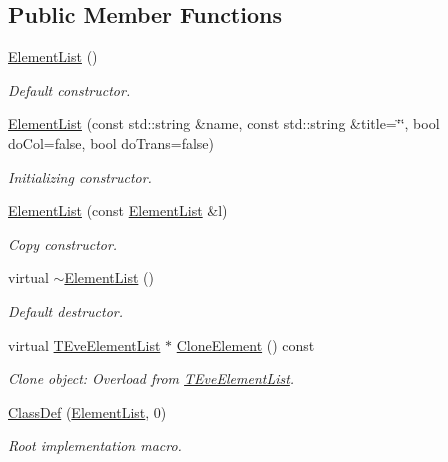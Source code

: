 \subsection*{Public Member Functions}
\begin{DoxyCompactItemize}
\item 
\hyperlink{class_d_d4hep_1_1_element_list_add023eff52a3dc205c33891c200cace1}{ElementList} ()
\begin{DoxyCompactList}\small\item\em Default constructor. \item\end{DoxyCompactList}\item 
\hyperlink{class_d_d4hep_1_1_element_list_a9ac013ec9cc0b96d6c31e19401765833}{ElementList} (const std::string \&name, const std::string \&title=\char`\"{}\char`\"{}, bool doCol=false, bool doTrans=false)
\begin{DoxyCompactList}\small\item\em Initializing constructor. \item\end{DoxyCompactList}\item 
\hyperlink{class_d_d4hep_1_1_element_list_a573686af3429e4ddceac2062f16d704f}{ElementList} (const \hyperlink{class_d_d4hep_1_1_element_list}{ElementList} \&l)
\begin{DoxyCompactList}\small\item\em Copy constructor. \item\end{DoxyCompactList}\item 
virtual \hyperlink{class_d_d4hep_1_1_element_list_a400de029850c5e46b89d0178b0a5f7dc}{$\sim$ElementList} ()
\begin{DoxyCompactList}\small\item\em Default destructor. \item\end{DoxyCompactList}\item 
virtual \hyperlink{class_t_eve_element_list}{TEveElementList} $\ast$ \hyperlink{class_d_d4hep_1_1_element_list_a74974daa0e5039b255f2fbc78629949d}{CloneElement} () const 
\begin{DoxyCompactList}\small\item\em Clone object: Overload from \hyperlink{class_t_eve_element_list}{TEveElementList}. \item\end{DoxyCompactList}\item 
\hyperlink{class_d_d4hep_1_1_element_list_a857af85f3fb5d9fd07519c846100f841}{ClassDef} (\hyperlink{class_d_d4hep_1_1_element_list}{ElementList}, 0)
\begin{DoxyCompactList}\small\item\em Root implementation macro. \item\end{DoxyCompactList}\end{DoxyCompactItemize}


